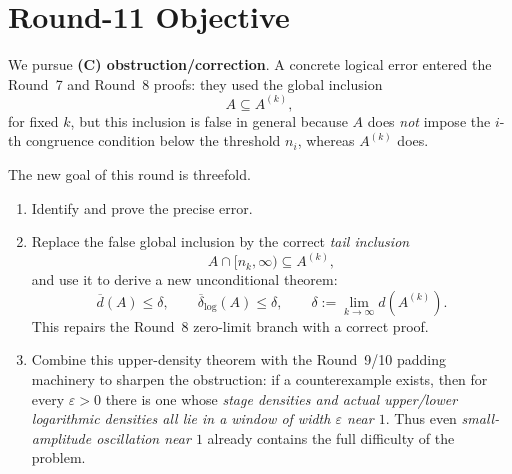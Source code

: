\section{Round-11 Objective}
We pursue \textbf{(C) obstruction/correction}.  A concrete logical error entered the Round~7 and Round~8 proofs: they used the global inclusion
\[
A\subseteq A^{(k)},
\]
for fixed $k$, but this inclusion is false in general because $A$ does \emph{not} impose the $i$-th congruence condition below the threshold $n_i$, whereas $A^{(k)}$ does.

The new goal of this round is threefold.
\begin{enumerate}
\item Identify and prove the precise error.
\item Replace the false global inclusion by the correct \emph{tail inclusion}
\[
A\cap[n_k,\infty)\subseteq A^{(k)},
\]
and use it to derive a new unconditional theorem:
\[
\overline d(A)\le \delta,
\qquad
\overline\delta_{\log}(A)\le \delta,
\qquad
\delta:=\lim_{k\to\infty}d(A^{(k)}).
\]
This repairs the Round~8 zero-limit branch with a correct proof.
\item Combine this upper-density theorem with the Round~9/10 padding machinery to sharpen the obstruction: if a counterexample exists, then for every $\varepsilon>0$ there is one whose \emph{stage densities and actual upper/lower logarithmic densities all lie in a window of width $\varepsilon$ near $1$}.  Thus even \emph{small-amplitude oscillation near $1$} already contains the full difficulty of the problem.
\end{enumerate}

